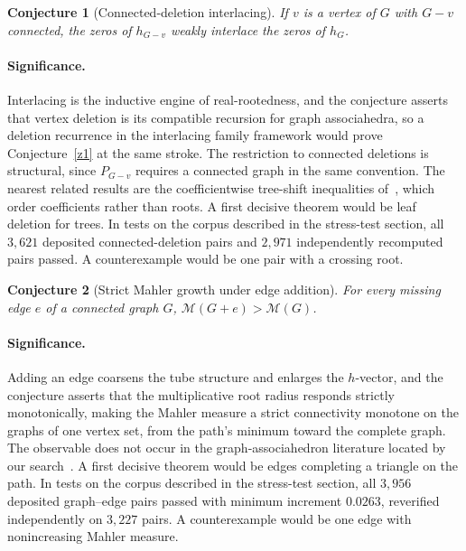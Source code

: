 \documentclass[11pt]{article}
\newtheorem{conjecture}{Conjecture}
\theoremstyle{definition}
\begin{document}
\begin{conjecture}[Connected-deletion interlacing]\label{z2}
If $v$ is a vertex of $G$ with $G-v$ connected, the zeros of $h_{G-v}$ weakly interlace the zeros of $h_G$.
\end{conjecture}

\paragraph{Significance.}
Interlacing is the inductive engine of real-rootedness, and the conjecture asserts that vertex deletion is its compatible recursion for graph associahedra, so a deletion recurrence in the interlacing family framework would prove Conjecture~\ref{z1} at the same stroke.  The restriction to connected deletions is structural, since $P_{G-v}$ requires a connected graph in the same convention.  The nearest related results are the coefficientwise tree-shift inequalities of~\cite{BV10,Ais12}, which order coefficients rather than roots.  A first decisive theorem would be leaf deletion for trees.  In tests on the corpus described in the stress-test section, all $3{,}621$ deposited connected-deletion pairs and $2{,}971$ independently recomputed pairs passed.  A counterexample would be one pair with a crossing root.

\begin{conjecture}[Strict Mahler growth under edge addition]\label{z3}
For every missing edge $e$ of a connected graph $G$, $\mathcal M(G+e)>\mathcal M(G)$.
\end{conjecture}

\paragraph{Significance.}
Adding an edge coarsens the tube structure and enlarges the $h$-vector, and the conjecture asserts that the multiplicative root radius responds strictly monotonically, making the Mahler measure a strict connectivity monotone on the graphs of one vertex set, from the path's minimum toward the complete graph.  The observable does not occur in the graph-associahedron literature located by our search~\cite{PRW08,BV10}.  A first decisive theorem would be edges completing a triangle on the path.  In tests on the corpus described in the stress-test section, all $3{,}956$ deposited graph--edge pairs passed with minimum increment $0.0263$, reverified independently on $3{,}227$ pairs.  A counterexample would be one edge with nonincreasing Mahler measure.
\end{document}
